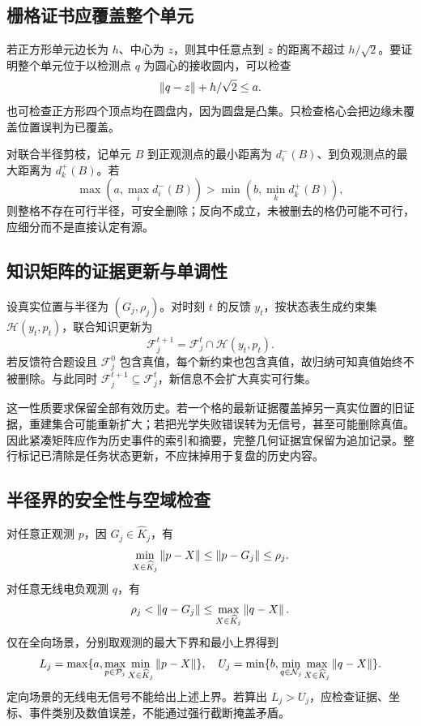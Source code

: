 \subsection{栅格证书应覆盖整个单元}
若正方形单元边长为 $h$、中心为 $z$，则其中任意点到 $z$ 的距离不超过 $h/\sqrt2$。要证明整个单元位于以检测点 $q$ 为圆心的接收圆内，可以检查
\begin{equation}
\left\lVert q-z\right\rVert+h/\sqrt2\le a.
\end{equation}
也可检查正方形四个顶点均在圆盘内，因为圆盘是凸集。只检查格心会把边缘未覆盖位置误判为已覆盖。

对联合半径剪枝，记单元 $B$ 到正观测点的最小距离为 $d_i^-(B)$、到负观测点的最大距离为 $d_k^+(B)$。若
\begin{equation}
\max\left(a,\max_i d_i^-(B)\right)>
\min\left(b,\min_k d_k^+(B)\right),
\end{equation}
则整格不存在可行半径，可安全删除；反向不成立，未被删去的格仍可能不可行，应细分而不是直接认定有源。

\subsection{知识矩阵的证据更新与单调性}
设真实位置与半径为 $(G_j,\rho_j)$。对时刻 $t$ 的反馈 $y_t$，按状态表生成约束集 $\mathcal H(y_t,p_t)$，联合知识更新为
\begin{equation}
\mathcal F_j^{t+1}=\mathcal F_j^t\cap\mathcal H(y_t,p_t).
\end{equation}
若反馈符合题设且 $\mathcal F_j^0$ 包含真值，每个新约束也包含真值，故归纳可知真值始终不被删除。与此同时 $\mathcal F_j^{t+1}\subseteq\mathcal F_j^t$，新信息不会扩大真实可行集。

这一性质要求保留全部有效历史。若一个格的最新证据覆盖掉另一真实位置的旧证据，重建集合可能重新扩大；若把光学失败错误转为无信号，甚至可能删除真值。因此紧凑矩阵应作为历史事件的索引和摘要，完整几何证据宜保留为追加记录。整行标记已清除是任务状态更新，不应抹掉用于复盘的历史内容。

\subsection{半径界的安全性与空域检查}
对任意正观测 $p$，因 $G_j\in\widehat K_j$，有
\begin{equation}
\min_{X\in\widehat K_j}\left\lVert p-X\right\rVert\le\left\lVert p-G_j\right\rVert\le\rho_j.
\end{equation}
对任意无线电负观测 $q$，有
\begin{equation}
\rho_j<\left\lVert q-G_j\right\rVert\le\max_{X\in\widehat K_j}\left\lVert q-X\right\rVert.
\end{equation}
仅在全向场景，分别取观测的最大下界和最小上界得到
\begin{equation}
L_j=\max\{a,\max_{p\in\mathcal P_j}\min_{X\in\widehat K_j}\left\lVert p-X\right\rVert\},\quad
U_j=\min\{b,\min_{q\in\mathcal N_j}\max_{X\in\widehat K_j}\left\lVert q-X\right\rVert\}.
\label{eq:radiusbounds}
\end{equation}
定向场景的无线电无信号不能给出上述上界。若算出 $L_j>U_j$，应检查证据、坐标、事件类别及数值误差，不能通过强行截断掩盖矛盾。

